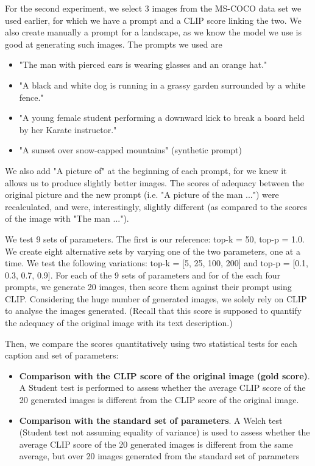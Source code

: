 \documentclass{article}
\begin{document}
\begin{multicols}{2}
For the second experiment, we select 3 images from the MS-COCO data set we used earlier, for which we have a prompt and a CLIP score linking the two. We also create manually a prompt for a landscape, as we know the model we use is good at generating such images. The prompts we used are
\begin{itemize}
    \item "The man with pierced ears is wearing glasses and an orange hat."
    \item "A black and white dog is running in a grassy garden surrounded by a white fence."
    \item "A young female student performing a downward kick to break a board held by her Karate instructor."
    \item "A sunset over snow-capped mountains" (synthetic prompt)
\end{itemize}
We also add "A picture of" at the beginning of each prompt, for we knew it allows us to produce slightly better images. The scores of adequacy between the original picture and the new prompt (i.e. "A picture of the man ...") were recalculated, and were, interestingly, slightly different (as compared to the scores of the image with "The man ..."). 

We test 9 sets of parameters. The first is our reference: top-k = 50, top-p = 1.0. We create eight alternative sets by varying one of the two parameters, one at a time. We test the following variations: top-k = [5, 25, 100, 200] and top-p = [0.1, 0.3, 0.7, 0.9]. For each of the 9 sets of parameters and for of the each four prompts, we generate 20 images, then score them against their prompt using CLIP. Considering the huge number of generated images, we solely rely on CLIP to analyse the images generated. (Recall that this score is supposed to quantify the adequacy of the original image with its text description.)

Then, we compare the scores quantitatively using two statistical tests for each caption and set of parameters:
\begin{itemize}
    \item \textbf{Comparison with the CLIP score of the original image (gold score)}. A Student test is performed to assess whether the average CLIP score of the 20 generated images is different from the CLIP score of the original image.
    \item \textbf{Comparison with the standard set of parameters}. A Welch test (Student test not assuming equality of variance) is used to assess whether the average CLIP score of the 20 generated images is different from the same average, but over 20 images generated from the standard set of parameters
\end{itemize}


\end{multicols}
\end{document}
